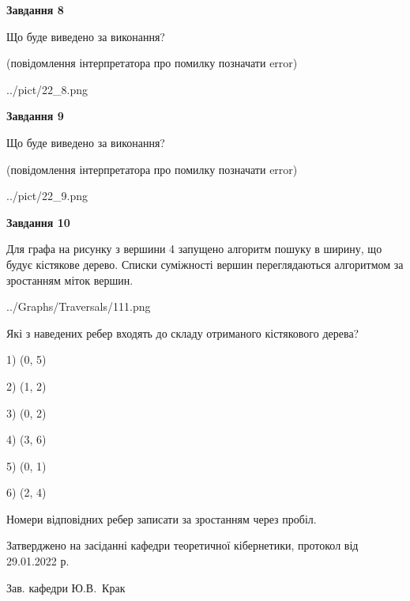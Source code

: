 \documentclass[12pt, ukrainian]{article}
\begin{document}
{\begin {large}
{\begin {center}\textbf{Завдання 8}\end {center}}\par
Що буде виведено за виконання?\par
 (повідомлення інтерпретатора про помилку позначати error)\par
\begin{center}
	{../pict/22_8.png}
\end{center}
\newpage

{\begin {center}\textbf{Завдання 9}\end {center}}\par
Що буде виведено за виконання?\par
 (повідомлення інтерпретатора про помилку позначати error)\par
\begin{center}
	{../pict/22_9.png}
\end{center}
\newpage

{\begin {center}\textbf{Завдання 10}\end {center}}\par
Для графа на рисунку з вершини 4 запущено алгоритм пошуку в ширину, що будує кістякове дерево. Списки суміжності вершин переглядаються алгоритмом за зростанням міток вершин.\par
\begin{center}
	{../Graphs/Traversals/111.png}
\end{center}
\par Які з наведених ребер входять до складу отриманого кістякового дерева?\par
1) (0, 5)\par
2) (1, 2)\par
3) (0, 2)\par
4) (3, 6)\par
5) (0, 1)\par
6) (2, 4)\par
{\vskip 15pt} Номери відповідних ребер записати за зростанням через пробіл.\par
\newpage


\end {large}
}
{\smallskip \begin {small} Затверджено на засіданні кафедри теоретичної кібернетики, протокол  від   29.01.2022 р.\par\smallskip\smallskip
{\parbox {6.5 cm}{Зав. кафедри \dotfill Ю.В.~Крак}} \end{small}}
\end{document}
